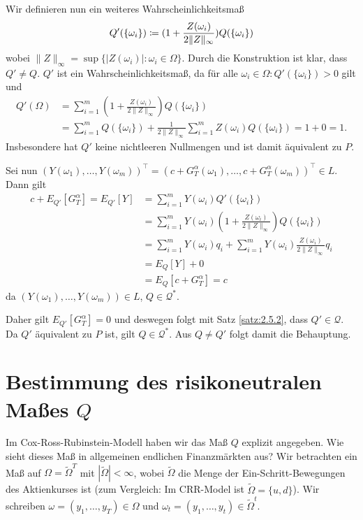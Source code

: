 \documentclass[a4paper,twoside,DIV15,BCOR12mm]{scrbook}
\newcommand{\cQ}{\mathcal Q}
\begin{document}
\begin{beweis}
Wir definieren nun ein weiteres Wahrscheinlichkeitsmaß 
\[
Q'(\{\omega_i\}) \da (1 + \frac{Z(\omega_i)}{2 \|Z\|_\infty}) Q(\{\omega_i\})
\]
wobei $\|Z\|_\infty = \sup \{|Z(\omega_i)|: \omega_i\in \Omega\}$. Durch die Konstruktion ist klar, dass $Q'\ne Q$. $Q'$ ist ein Wahrscheinlichkeitsmaß, da für alle $\omega_i\in \Omega: Q'(\{\omega_i\}) > 0$ gilt und
\begin{align*}
Q'(\Omega) &= \sum_{i=1}^m (1 + \frac{Z(\omega_i)}{2\|Z\|_\infty})Q(\{\omega_i\}) \\
&= \sum_{i=1}^m Q(\{\omega_i\}) + \frac{1}{2\|Z\|_\infty} \sum_{i=1}^m Z(\omega_i)Q(\{\omega_i\}) = 1 + 0 = 1.
\end{align*}
Insbesondere hat $Q'$ keine nichtleeren Nullmengen und ist damit äquivalent zu $P$.


Sei nun $(Y(\omega_1),\ldots,Y(\omega_m))^\top = (c + G_T^\alpha(\omega_1),\ldots,c + G_T^\alpha(\omega_m))^\top \in L$. Dann gilt
\begin{align*}
c + E_{Q'} [G_T^\alpha]  = E_{Q'}[Y]
&= \sum_{i=1}^m Y(\omega_i)Q'(\{\omega_i\})\\
&= \sum_{i=1}^m Y(\omega_i) (1 + \frac{Z(\omega_i)}{2\|Z\|_\infty})Q(\{\omega_i\}) \\
&= \sum_{i=1}^m Y(\omega_i)q_i + \sum_{i=1}^m Y(\omega_i) \frac{Z(\omega_i)}{2\|Z\|_\infty} q_i \\
&= E_Q[Y] + 0 \\
&= E_Q[c + G_T^\alpha] = c
\end{align*}
da $(Y(\omega_1),\ldots,Y(\omega_m))\in L$, $Q\in \cQ^*$.

Daher gilt $E_{Q'}[G_T^\alpha] = 0$ und deswegen folgt mit Satz \ref{satz:2.5.2}, dass $Q'\in \cQ$. Da $Q'$ äquivalent zu $P$ ist, gilt $Q\in \cQ^*$. Aus $Q\ne Q'$ folgt damit die Behauptung.
\end{beweis}

\section{Bestimmung des risikoneutralen Maßes $Q$}

Im Cox-Ross-Rubinstein-Modell haben wir das Maß $Q$ explizit angegeben. Wie sieht dieses Maß in allgemeinen endlichen Finanzmärkten aus? Wir betrachten ein Maß auf $\Omega = \tilde\Omega^T$ mit $|\tilde\Omega|<\infty$, wobei $\tilde\Omega$ die Menge der Ein-Schritt-Bewegungen des Aktienkurses ist (zum Vergleich: Im CRR-Model ist $\tilde\Omega=\{u,d\}$). Wir schreiben $\omega=(y_1,\ldots,y_T)\in \Omega$ und $\omega_t = (y_1,\ldots,y_t)\in \tilde\Omega^t$.
\end{document}
